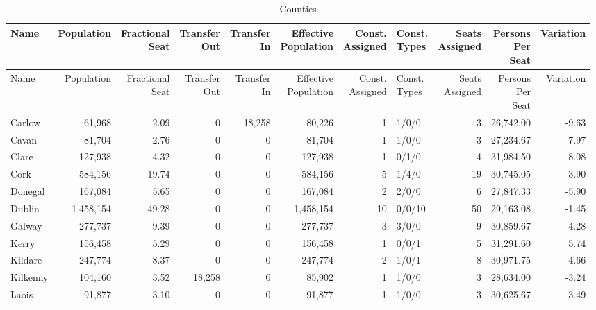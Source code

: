 \documentclass[a4paper]{article}
\begin{document}
\begin{longtable}{lrrrrrrlrrr}
\caption{Counties}
\\ \toprule
Name &Population &\shortstack{Fractional\\Seat} &\shortstack{Transfer\\Out} &\shortstack{Transfer\\In} &\shortstack{Effective\\Population} &\shortstack{Const.\\Assigned} &\shortstack{Const.\\Types} &\shortstack{Seats\\Assigned} &\shortstack{Persons\\Per\\Seat} &Variation \\ \midrule
\endfirsthead
\toprule
Name &Population &\shortstack{Fractional\\Seat} &\shortstack{Transfer\\Out} &\shortstack{Transfer\\In} &\shortstack{Effective\\Population} &\shortstack{Const.\\Assigned} &\shortstack{Const.\\Types} &\shortstack{Seats\\Assigned} &\shortstack{Persons\\Per\\Seat} &Variation \\ \midrule
\endhead
\bottomrule
\endfoot
Carlow&61,968& 2.09&0&18,258&80,226&1&1/0/0&3&26,742.00&-9.63\\ 
Cavan&81,704& 2.76&0&0&81,704&1&1/0/0&3&27,234.67&-7.97\\ 
Clare&127,938& 4.32&0&0&127,938&1&0/1/0&4&31,984.50& 8.08\\ 
Cork&584,156&19.74&0&0&584,156&5&1/4/0&19&30,745.05& 3.90\\ 
Donegal&167,084& 5.65&0&0&167,084&2&2/0/0&6&27,847.33&-5.90\\ 
Dublin&1,458,154&49.28&0&0&1,458,154&10&0/0/10&50&29,163.08&-1.45\\ 
Galway&277,737& 9.39&0&0&277,737&3&3/0/0&9&30,859.67& 4.28\\ 
Kerry&156,458& 5.29&0&0&156,458&1&0/0/1&5&31,291.60& 5.74\\ 
Kildare&247,774& 8.37&0&0&247,774&2&1/0/1&8&30,971.75& 4.66\\ 
Kilkenny&104,160& 3.52&18,258&0&85,902&1&1/0/0&3&28,634.00&-3.24\\ 
Laois&91,877& 3.10&0&0&91,877&1&1/0/0&3&30,625.67& 3.49\\ 

\end{longtable}
\end{document}
